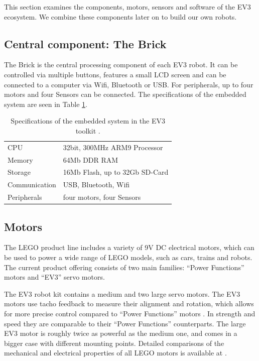 \documentclass[11pt, a4paper]{article}
\begin{document}
	This section examines the components, motors, sensors and software of the EV3 ecosystem. We combine these components later on to build our own robots.
	
	\subsection{Central component: The Brick}
	The Brick is the central processing component of each EV3 robot. It can be controlled via multiple buttons, features a small LCD screen and can be connected to a computer via Wifi, Bluetooth or USB. For peripherals, up to four motors and four Sensors can be connected. The specifications of the embedded system are seen in Table \ref{tab:EV3_dev_toolkit}.
	
	\begin{table}[H]
		\centering
		\begin{tabular}{ll}
			CPU & 32bit, 300MHz ARM9 Processor \\
			Memory & 64Mb DDR RAM\\
			Storage & 16Mb Flash, up to 32Gb SD-Card \\
			Communication & USB, Bluetooth, Wifi \\
			Peripherals & four motors, four Sensors
			
		\end{tabular}
		\caption{Specifications of the embedded system in the EV3 toolkit \cite{ev3_dev_toolkit}.}
		\label{tab:EV3_dev_toolkit}
	\end{table}
	
	
	\subsection{Motors}
	The LEGO product line includes a variety of 9V DC electrical motors, which can be used to power a wide range of LEGO models, such as cars, trains and robots. The current product offering consists of two main families: ``Power Functions'' motors and ``EV3'' servo motors. 
	\medskip
	
	The EV3 robot kit contains a medium and two large servo motors. The EV3 motors use tacho feedback to measure their alignment and rotation, which allows for more precise control compared to ``Power Functions'' motors \cite{Servo_Motor}. In strength and speed they are comparable to their ``Power Functions'' counterparts. The large EV3 motor is roughly twice as powerful as the medium one, and comes in a bigger case with different mounting points. Detailed comparisons of the mechanical and electrical properties of all LEGO motors is available at \cite{motor_comparison}.
	
\end{document}
